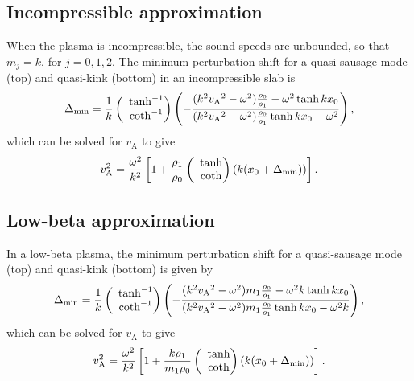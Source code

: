 \documentclass[namedreferences]{solarphysics}
\numberwithin{equation}{section}
\begin{document}
\begin{article}
\subsection{Incompressible approximation}
When the plasma is incompressible, the sound speeds are unbounded, so that $m_j = k$, for $j = 0, 1, 2$. The minimum perturbation shift for a quasi-sausage mode (top) and quasi-kink (bottom) in an incompressible slab is
\begin{equation}
\Delta_\textrm{min} = \frac{1}{k}\left(\hspace{-0.07in}\begin{matrix} &\tanh^{-1} \\ &\coth^{-1} \end{matrix}\right)\left(-\frac{(k^2{v_\textrm{A}}^2-\omega^2)\frac{\rho_0}{\rho_1} - \omega^2\tanh{kx_0}}{(k^2{v_\textrm{A}}^2-\omega^2)\frac{\rho_0}{\rho_1}\tanh{kx_0} - \omega^2}\right),
\end{equation}
which can be solved for $v_\textrm{A}$ to give
\begin{equation}
v_\textrm{A}^2 = \frac{\omega^2}{k^2}\left[1 + \frac{\rho_1}{\rho_0}\left(\hspace{-0.07in}\begin{matrix} &\tanh \\ &\coth \end{matrix}\right)(k(x_0 + \Delta_\textrm{min}))\right].
\end{equation}


\subsection{Low-beta approximation}
In a low-beta plasma, the minimum perturbation shift for a quasi-sausage mode (top) and quasi-kink (bottom) is given by
\begin{equation}
\Delta_\textrm{min} = \frac{1}{k}\left(\hspace{-0.07in}\begin{matrix} &\tanh^{-1} \\ &\coth^{-1} \end{matrix}\right)\left(-\frac{(k^2{v_\textrm{A}}^2-\omega^2)m_1\frac{\rho_0}{\rho_1} - \omega^2k\tanh{kx_0}}{(k^2{v_\textrm{A}}^2-\omega^2)m_1\frac{\rho_0}{\rho_1}\tanh{kx_0} - \omega^2k}\right),
\end{equation}
which can be solved for $v_\textrm{A}$ to give
\begin{equation}
v_\textrm{A}^2 = \frac{\omega^2}{k^2}\left[1 + \frac{k\rho_1}{m_1\rho_0}\left(\hspace{-0.07in}\begin{matrix} &\tanh \\ &\coth \end{matrix}\right)(k(x_0 + \Delta_\textrm{min}))\right].
\end{equation}


\end{article}
\end{document}
